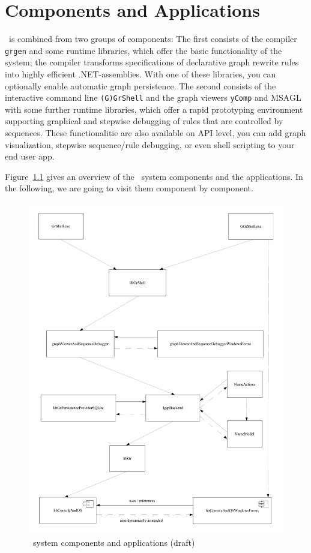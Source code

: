 \chapter{Components and Applications}
\label{cha:toolsandcomponents}

\GrG\ is combined from two groups of components:
The first consists of the compiler \texttt{grgen} and some runtime libraries, which offer the basic functionality of the system;
the compiler transforms specifications of declarative graph rewrite rules into highly efficient .NET-assemblies.
With one of these libraries, you can optionally enable automatic graph persistence.
The second consists of the interactive command line \texttt{(G)GrShell} and the graph viewers \texttt{yComp} and MSAGL with some further runtime libraries,
which offer a rapid prototyping environment supporting graphical and stepwise debugging of rules that are controlled by sequences.
These functionalitie are also available on API level, you can add graph visualization, stepwise sequence/rule debugging, or even shell scripting to your end user app.

Figure~\ref{figcomponentsapps} gives an overview of the \GrG\ system components and the applications.
In the following, we are going to visit them component by component.

\begin{figure}[htbp]
  \centering
  \includegraphics[width=\textwidth]{fig/ComponentsAndApps}
  \caption{\GrG\ system components and applications (draft)}
  \label{figcomponentsapps}
\end{figure}


